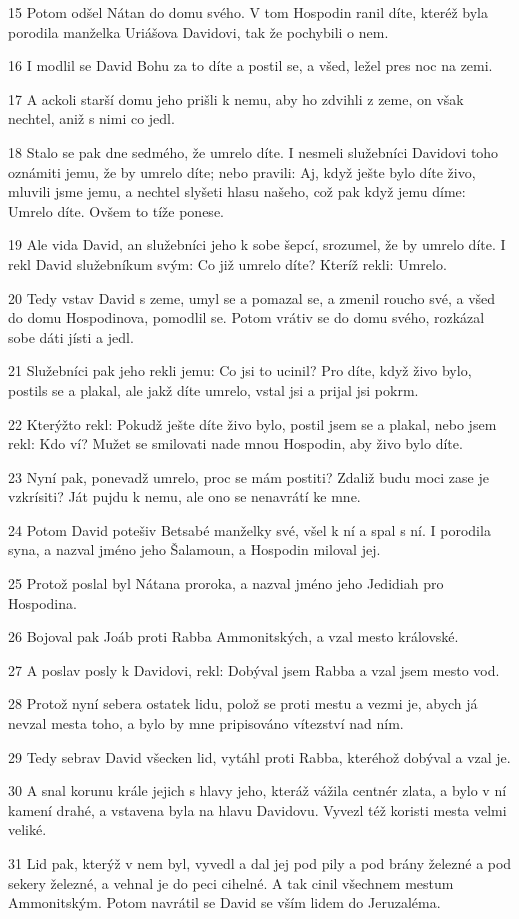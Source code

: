 \par 15 Potom odšel Nátan do domu svého. V tom Hospodin ranil díte, kteréž byla porodila manželka Uriášova Davidovi, tak že pochybili o nem.
\par 16 I modlil se David Bohu za to díte a postil se, a všed, ležel pres noc na zemi.
\par 17 A ackoli starší domu jeho prišli k nemu, aby ho zdvihli z zeme, on však nechtel, aniž s nimi co jedl.
\par 18 Stalo se pak dne sedmého, že umrelo díte. I nesmeli služebníci Davidovi toho oznámiti jemu, že by umrelo díte; nebo pravili: Aj, když ješte bylo díte živo, mluvili jsme jemu, a nechtel slyšeti hlasu našeho, což pak když jemu díme: Umrelo díte. Ovšem to tíže ponese.
\par 19 Ale vida David, an služebníci jeho k sobe šepcí, srozumel, že by umrelo díte. I rekl David služebníkum svým: Co již umrelo díte? Kteríž rekli: Umrelo.
\par 20 Tedy vstav David s zeme, umyl se a pomazal se, a zmenil roucho své, a všed do domu Hospodinova, pomodlil se. Potom vrátiv se do domu svého, rozkázal sobe dáti jísti a jedl.
\par 21 Služebníci pak jeho rekli jemu: Co jsi to ucinil? Pro díte, když živo bylo, postils se a plakal, ale jakž díte umrelo, vstal jsi a prijal jsi pokrm.
\par 22 Kterýžto rekl: Pokudž ješte díte živo bylo, postil jsem se a plakal, nebo jsem rekl: Kdo ví? Mužet se smilovati nade mnou Hospodin, aby živo bylo díte.
\par 23 Nyní pak, ponevadž umrelo, proc se mám postiti? Zdaliž budu moci zase je vzkrísiti? Ját pujdu k nemu, ale ono se nenavrátí ke mne.
\par 24 Potom David potešiv Betsabé manželky své, všel k ní a spal s ní. I porodila syna, a nazval jméno jeho Šalamoun, a Hospodin miloval jej.
\par 25 Protož poslal byl Nátana proroka, a nazval jméno jeho Jedidiah pro Hospodina.
\par 26 Bojoval pak Joáb proti Rabba Ammonitských, a vzal mesto královské.
\par 27 A poslav posly k Davidovi, rekl: Dobýval jsem Rabba a vzal jsem mesto vod.
\par 28 Protož nyní sebera ostatek lidu, polož se proti mestu a vezmi je, abych já nevzal mesta toho, a bylo by mne pripisováno vítezství nad ním.
\par 29 Tedy sebrav David všecken lid, vytáhl proti Rabba, kteréhož dobýval a vzal je.
\par 30 A snal korunu krále jejich s hlavy jeho, kteráž vážila centnér zlata, a bylo v ní kamení drahé, a vstavena byla na hlavu Davidovu. Vyvezl též koristi mesta velmi veliké.
\par 31 Lid pak, kterýž v nem byl, vyvedl a dal jej pod pily a pod brány železné a pod sekery železné, a vehnal je do peci cihelné. A tak cinil všechnem mestum Ammonitským. Potom navrátil se David se vším lidem do Jeruzaléma.


